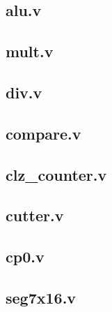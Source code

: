 \documentclass[12pt,a4paper]{article}
\begin{document}
\subsection{alu.v}
\begingroup
\footnotesize
\linespread{0.8}\selectfont

\endgroup
\clearpage

\subsection{mult.v}
\begingroup
\footnotesize
\linespread{0.8}\selectfont

\endgroup
\clearpage

\subsection{div.v}
\begingroup
\footnotesize
\linespread{0.8}\selectfont

\endgroup
\clearpage

\subsection{compare.v}
\begingroup
\footnotesize
\linespread{0.8}\selectfont

\endgroup
\clearpage

\subsection{clz\_counter.v}
\begingroup
\footnotesize
\linespread{0.8}\selectfont

\endgroup
\clearpage

\subsection{cutter.v}
\begingroup
\footnotesize
\linespread{0.8}\selectfont

\endgroup
\clearpage

\subsection{cp0.v}
\begingroup
\footnotesize
\linespread{0.8}\selectfont

\endgroup
\clearpage

\subsection{seg7x16.v}
\begingroup
\footnotesize
\linespread{0.8}\selectfont

\endgroup
\clearpage
\end{document}
